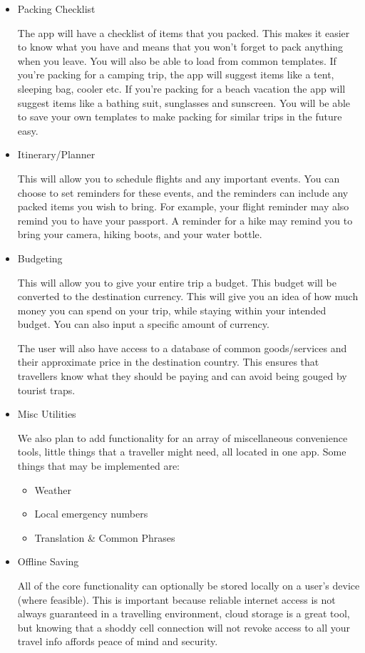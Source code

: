 \documentclass[12pt]{article}
\begin{document}
\begin{itemize}

	\item{Packing Checklist}

	The app will have a checklist of items that you packed.
	This makes it easier to know what you have and means that you won't forget to pack anything when you leave.
	You will also be able to load from common templates.
	If you're packing for a camping trip, the app will suggest items like a tent, sleeping bag, cooler etc.
	If you're packing for a beach vacation the app will suggest items like a bathing suit, sunglasses and sunscreen.
	You will be able to save your own templates to make packing for similar trips in the future easy.

	\item{Itinerary/Planner}

	This will allow you to schedule flights and any important events.
	You can choose to set reminders for these events, and the reminders can include any packed items you wish to bring.
	For example, your flight reminder may also remind you to have your passport.
	A reminder for a hike may remind you to bring your camera, hiking boots, and your water bottle.

	\item{Budgeting}

	This will allow you to give your entire trip a budget.
	This budget will be converted to the destination currency.
	This will give you an idea of how much money you can spend on your trip,
	while staying within your intended budget.
	You can also input a specific amount of currency.

	The user will also have access to a database of common goods/services and their approximate price in the destination country.
	This ensures that travellers know what they should be paying and can avoid being gouged by tourist traps.

	\item{Misc Utilities}

	We also plan to add functionality for an array of miscellaneous convenience tools,
	little things that a traveller might need, all located in one app.
	Some things that may be implemented are:

	\begin{itemize}
		\item Weather
		\item Local emergency numbers
		\item Translation \& Common Phrases
	\end{itemize}

	\item{Offline Saving}

	All of the core functionality can optionally be stored locally on a user's device (where feasible).
	This is important because reliable internet access is not always guaranteed in a travelling environment,
	cloud storage is a great tool, but knowing that a shoddy cell connection will not revoke access to all your
	travel info affords peace of mind and security.

\end{itemize}
\end{document}
